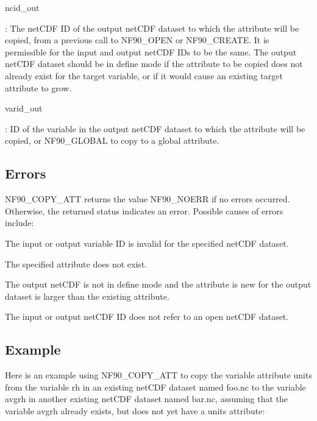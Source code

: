 {\ttfamily ncid\+\_\+out}

\+: The net\+C\+DF ID of the output net\+C\+DF dataset to which the attribute will be copied, from a previous call to N\+F90\+\_\+\+O\+P\+EN or N\+F90\+\_\+\+C\+R\+E\+A\+TE. It is permissible for the input and output net\+C\+DF I\+Ds to be the same. The output net\+C\+DF dataset should be in define mode if the attribute to be copied does not already exist for the target variable, or if it would cause an existing target attribute to grow.

{\ttfamily varid\+\_\+out}

\+: ID of the variable in the output net\+C\+DF dataset to which the attribute will be copied, or N\+F90\+\_\+\+G\+L\+O\+B\+AL to copy to a global attribute.

\subsection*{Errors}

N\+F90\+\_\+\+C\+O\+P\+Y\+\_\+\+A\+TT returns the value N\+F90\+\_\+\+N\+O\+E\+RR if no errors occurred. Otherwise, the returned status indicates an error. Possible causes of errors include\+:


\begin{DoxyItemize}
\item The input or output variable ID is invalid for the specified net\+C\+DF dataset.
\item The specified attribute does not exist.
\item The output net\+C\+DF is not in define mode and the attribute is new for the output dataset is larger than the existing attribute.
\item The input or output net\+C\+DF ID does not refer to an open net\+C\+DF dataset.
\end{DoxyItemize}

\subsection*{Example}

Here is an example using N\+F90\+\_\+\+C\+O\+P\+Y\+\_\+\+A\+TT to copy the variable attribute units from the variable rh in an existing net\+C\+DF dataset named foo.\+nc to the variable avgrh in another existing net\+C\+DF dataset named bar.\+nc, assuming that the variable avgrh already exists, but does not yet have a units attribute\+:


